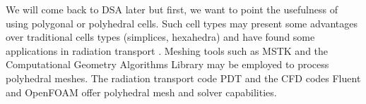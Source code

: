 We will come back to DSA later but first, we want to point the usefulness 
of using polygonal or polyhedral cells. Such cell types may present some 
advantages over traditional cells types (simplices, hexahedra) and have found 
some applications in radiation transport \cite{pwld_3d,pwld_2d,cfm_dfm}. 
Meshing tools such as MSTK
\cite{mstk} and the Computational Geometry Algorithms Library \cite{cgal} may
be employed to process polyhedral meshes. The radiation transport
code PDT and the CFD codes Fluent \cite{fluent_2,fluent_1} and OpenFOAM
\cite{openfoam} offer polyhedral mesh and solver capabilities.

